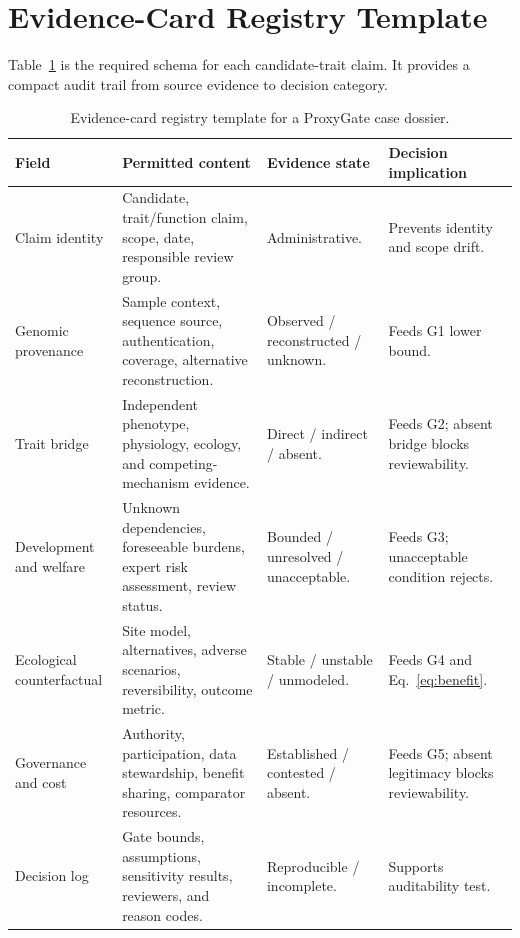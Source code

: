 \documentclass[conference]{IEEEtran}
\begin{document}
\appendices
\section{Evidence-Card Registry Template}

Table~\ref{tab:registry} is the required schema for each candidate-trait claim. It provides a compact audit trail from source evidence to decision category.

\begin{table}[t]
\caption{Evidence-card registry template for a ProxyGate case dossier.}
\label{tab:registry}
\centering
\footnotesize
\setlength{\tabcolsep}{2.5pt}
\begin{tabular}{p{} p{} p{} p{}}
\toprule
\textbf{Field} & \textbf{Permitted content} & \textbf{Evidence state} & \textbf{Decision implication} \\
\midrule
Claim identity & Candidate, trait/function claim, scope, date, responsible review group. & Administrative. & Prevents identity and scope drift. \\
Genomic provenance & Sample context, sequence source, authentication, coverage, alternative reconstruction. & Observed / reconstructed / unknown. & Feeds G1 lower bound. \\
Trait bridge & Independent phenotype, physiology, ecology, and competing-mechanism evidence. & Direct / indirect / absent. & Feeds G2; absent bridge blocks reviewability. \\
Development and welfare & Unknown dependencies, foreseeable burdens, expert risk assessment, review status. & Bounded / unresolved / unacceptable. & Feeds G3; unacceptable condition rejects. \\
Ecological counterfactual & Site model, alternatives, adverse scenarios, reversibility, outcome metric. & Stable / unstable / unmodeled. & Feeds G4 and Eq.~\eqref{eq:benefit}. \\
Governance and cost & Authority, participation, data stewardship, benefit sharing, comparator resources. & Established / contested / absent. & Feeds G5; absent legitimacy blocks reviewability. \\
Decision log & Gate bounds, assumptions, sensitivity results, reviewers, and reason codes. & Reproducible / incomplete. & Supports auditability test. \\
\bottomrule
\end{tabular}
\end{table}
\end{document}
